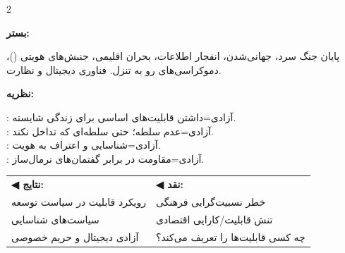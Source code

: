 \begin{tcolorbox}[mybox, title={موج ششم | معاصر | \lr{1990 -- present}},
  colframe=EraPostmod, colback=EraPostmod!5,
  boxed title style={colback=EraPostmod}]

\begin{multicols}{2}

\textbf{\color{EraPostmod}بستر:}

پایان جنگ سرد، جهانی‌شدن، انفجار اطلاعات، بحران اقلیمی، جنبش‌های هویتی ()، دموکراسی‌های رو به تنزل. فناوری دیجیتال و نظارت.

\columnbreak

\textbf{\color{EraPostmod}نظریه:}

: آزادی=داشتن قابلیت‌های اساسی برای زندگی شایسته.\\
: آزادی=عدم سلطه؛ حتی سلطه‌ای که تداخل نکند.\\
: آزادی=شناسایی و اعتراف به هویت.\\
: آزادی=مقاومت در برابر گفتمان‌های نرمال‌ساز.

\end{multicols}

\vspace{0.3cm}
\begin{tabular}{p{5cm}p{5cm}}
\textcolor{AccentGreen}{\textbf{◀ نتایج:}} & \textcolor{AccentRed}{\textbf{◀ نقد:}} \\
رویکرد قابلیت در سیاست توسعه & خطر نسبیت‌گرایی فرهنگی \\
سیاست‌های شناسایی & تنش قابلیت/کارایی اقتصادی \\
آزادی دیجیتال و حریم خصوصی & چه کسی قابلیت‌ها را تعریف می‌کند؟ \\
\end{tabular}

\end{tcolorbox}

\newpage
